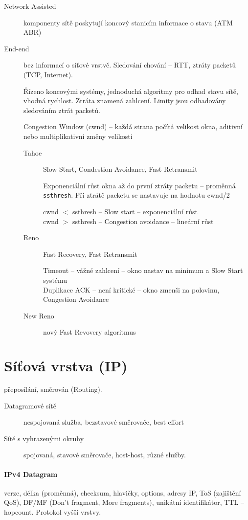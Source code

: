 \documentclass[a4paper, 11pt]{report}
\begin{document}
\begin{description}
	\item[Network Assisted] komponenty sítě poskytují koncový stanicím informace o stavu (ATM ABR)

	\item[End-end] bez informací o síťové vrstvě. Sledování chování -- RTT, ztráty packetů (TCP, Internet).

Řízeno koncovými systémy, jednoduchá algoritmy pro odhad stavu sítě, vhodná rychlost. Ztráta znamená zahlcení. Limity jsou odhadovány sledováním ztrát packetů.

Congestion Window (cwnd) -- každá strana počítá velikost okna, aditivní nebo multiplikativní změny velikosti

\begin{description}
	\item[Tahoe] Slow Start, Condestion Avoidance, Fast Retransmit
	
	Exponenciální růst okna až do první ztráty packetu -- proměnná \verb|ssthresh|. Při ztrátě packetu se nastavuje na hodnotu cwnd/2
	
	cwnd $<$ ssthresh -- Slow start -- exponenciální růst\\
	cwnd $>$ ssthresh -- Congestion avoidance -- lineární růst\\
	\item[Reno] Fast Recovery, Fast Retransmit
	
	Timeout  -- vážné zahlcení -- okno nastav na minimum a Slow Start systému \\
	Duplikace ACK -- není kritické -- okno zmenši na polovinu, Congestion Avoidance
	\item[New Reno] nový Fast Revovery algoritmus
\end{description}	
\end{description}	

\section{Síťová vrstva (IP)}
přeposílání, směrován (Routing).

\begin{description}
	\item[Datagramové sítě] nespojovaná služba, bezstavové směrovače, best effort
	\item[Sítě s vyhrazenými okruhy] spojovaná, stavové směrovače, host-host, různé služby.
\end{description}

\paragraph{IPv4 Datagram} verze, délka (proměnná), checksum, hlavičky, options, adresy IP, ToS (zajištění QoS), DF/MF (Don't fragment, More fragments), unikátní identifikátor, TTL -- hopcount. Protokol vyšší vrstvy.
\end{document}
